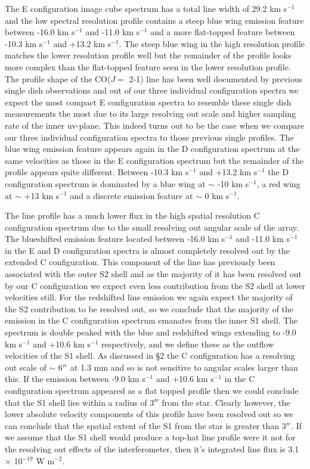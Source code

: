 \documentclass[iop]{emulateapj}
\begin{document}
The E configuration image cube spectrum has a total line width of 29.2 km s${}^{-1}$ and the low spectral resolution profile contains a steep blue wing emission feature between -16.0 km s${}^{-1}$ and -11.0 km s${}^{-1}$ and a more flat-topped feature between -10.3 km s${}^{-1}$ and +13.2 km s${}^{-1}$. The steep blue wing in the high resolution profile matches the lower resolution profile well but the  remainder of the profile looks more complex than the flat-topped feature seen in the lower resolution profile. The profile shape of the CO($J=$ 2-1) line has been well documented by previous single dish observations \citep[e.g.][]{1980ApJ...242L..25K, 1987ApJ...313..400H} and out of our three individual configuration spectra we expect the most compact E configuration spectra to resemble these single dish measurements the most due to its large resolving out scale and higher sampling rate of the inner uv-plane. This indeed turns out to be the case when we compare our three individual configuration spectra to those previous single profiles. The blue wing emission feature appears again in the D configuration spectrum at the same velocities as those in the E configuration spectrum but the remainder of the profile appears quite different. Between -10.3 km s${}^{-1}$ and +13.2 km s${}^{-1}$ the D configuration spectrum is dominated by a blue wing at $\sim$ -10 km s${}^{-1}$, a red wing at $\sim$ +13 km s${}^{-1}$ and a discrete emission feature at $\sim$ 0 km s${}^{-1}$. 

The line profile has a much lower flux in the high spatial resolution C configuration spectrum due to the small resolving out angular scale of the array. The blueshifted emission feature located between -16.0 km s${}^{-1}$ and -11.0 km s${}^{-1}$ in the E and D configuration spectra is almost completely resolved out by the extended C configuration. This component of the line has previously been associated with the outer S2 shell \citep{1987ApJ...313..400H} and as the majority of it has been resolved out by our C configuration we expect even less contribution from the S2 shell at lower velocities still. For the redshifted line emission we again expect the majority of the S2 contribution to be resolved out, so we conclude that the majority of the emission in the C configuration spectrum emanates from the inner S1 shell. The spectrum is double peaked with the blue and redshifted wings extending to -9.0 km s${}^{-1}$ and +10.6 km s${}^{-1}$ respectively, and we define these as the outflow velocities of the S1 shell. As discussed in \S2 the C configuration has a resolving out scale of $\sim$ 6$\mbox{$^{\prime\prime}$}$ at 1.3 mm and so is not sensitive to angular scales larger than this. If the emission between -9.0 km s${}^{-1}$ and +10.6 km s${}^{-1}$ in the C configuration spectrum appeared as a flat topped profile then we could conclude that the S1 shell lies within a radius of 3$\mbox{$^{\prime\prime}$}$ from the star. Clearly however, the lower absolute velocity components of this profile have been resolved out so we can conclude that the spatial extent of the S1 from the star is greater than 3$\mbox{$^{\prime\prime}$}$. If we assume that the S1 shell would produce a top-hat line profile were it not for the resolving out effects of the interferometer, then it's integrated line flux is 3.1 $\times$ 10${}^{-19}$ W m${}^{-2}$.
\end{document}
